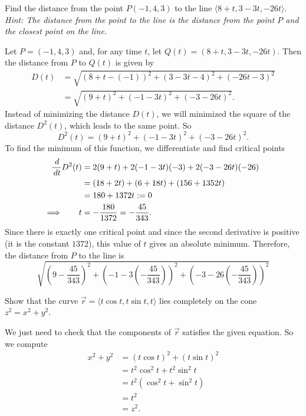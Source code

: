 \documentclass[noinstructornotes]{ximera}
\begin{document}
\begin{problem}
Find the distance from the point $P(-1,4,3)$ to the line $\langle 8+t,3-3t,-26t \rangle$.  {\it Hint: The distance from the point to the line is the distance from the point $P$ and the closest point on the line.}
	\begin{freeResponse}
	Let $P = (-1,4,3)$ and, for any time $t$, let $Q(t) = (8+t,3-3t,-26t)$.  
	Then the distance from $P$ to $Q(t)$ is given by
		\begin{align*}
		D(t) &=
		\sqrt{(8+t - (-1))^2 + (3-3t -4)^2 + (-26t-3)^2}  \\
		&= \sqrt{(9+t)^2 + (-1-3t)^2 + (-3-26t)^2}.
		\end{align*}
	Instead of minimizing the distance $D(t)$, we will minimized the square of the distance $D^2(t)$, which leads to the same point.  
	So
		\[
		D^2(t) = (9+t)^2 + (-1-3t)^2 + (-3-26t)^2.
		\]
	To find the minimum of this function, we differentiate and find critical points
		\begin{align*}
		\frac{\,d}{\,d t} D^2(t) &= 2(9+t) + 2(-1-3t)(-3) + 2(-3-26t)(-26)  \\
		&= (18 + 2t) + (6 + 18t) + (156 + 1352t)  \\
		&= 180 + 1372t := 0  \\
		\Longrightarrow \qquad t &= - \frac{180}{1372} = - \frac{45}{343}.
		\end{align*}
	Since there is exactly one critical point and since the second derivative is positive (it is the constant $1372$), this value of $t$ gives an absolute minimum.
	Therefore, the distance from $P$ to the line is
		\[
		\boxed{\sqrt{\left( 9-\frac{45}{343} \right)^2 + \left(-1-3\left( - \frac{45}{343} \right) \right)^2 + \left(-3-26\left( - \frac{45}{343} \right) \right)^2}}
		\]
	\end{freeResponse}
		
\end{problem}

\begin{instructorNotes}

\end{instructorNotes}







\begin{problem}
Show that the curve $\vec{r} = \langle t \cos t, t \sin t, t \rangle$ lies completely on the cone $z^2 = x^2 + y^2$.  
	\begin{freeResponse}
	We just need to check that the components of $\vec{r}$ satisfies the given equation.  
	So we compute
		\begin{align*}
		x^2 + y^2 &= (t \cos t)^2 + (t \sin t)^2  \\
		&= t^2 \cos^2 t + t^2 \sin^2 t  \\
		&= t^2 (\cos^2 t + \sin^2 t)  \\
		&= t^2  \\
		&= z^2.
		\end{align*}
	\end{freeResponse}

\end{problem}
\end{document}
